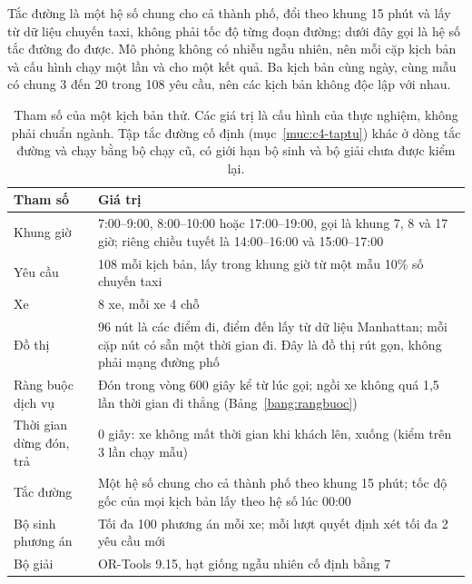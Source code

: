 Tắc đường là một hệ số chung cho cả thành phố, đổi theo khung 15 phút và lấy từ dữ liệu chuyến taxi, không phải tốc độ
từng đoạn đường; dưới đây gọi là hệ số tắc đường đo được. Mô phỏng không có nhiễu ngẫu nhiên, nên mỗi cặp
kịch bản và cấu hình chạy một lần và cho một kết quả. Ba kịch bản cùng ngày, cùng mẫu có chung 3 đến 20 trong 108 yêu
cầu, nên các kịch bản không độc lập với nhau.

\begin{table}[htbp]
\centering
\caption{Tham số của một kịch bản thử. Các giá trị là cấu hình của thực nghiệm, không phải chuẩn ngành. Tập tắc
đường cố định (mục~\ref{muc:c4-taptu}) khác ở dòng tắc đường và chạy bằng bộ chạy cũ, có giới hạn bộ sinh và bộ
giải chưa được kiểm lại.}
\label{bang:c4-thamso}
\small
\begin{tabular}{@{}p{4.0cm}p{11.0cm}@{}}
\toprule
\textbf{Tham số} & \textbf{Giá trị}\\
\midrule
Khung giờ & 7:00--9:00, 8:00--10:00 hoặc 17:00--19:00, gọi là khung 7, 8 và 17 giờ; riêng chiều tuyết
là 14:00--16:00 và 15:00--17:00\\
Yêu cầu & 108 mỗi kịch bản, lấy trong khung giờ từ một mẫu 10\% số chuyến taxi\\
Xe & 8 xe, mỗi xe 4 chỗ\\
Đồ thị & 96 nút là các điểm đi, điểm đến lấy từ dữ liệu Manhattan; mỗi cặp nút có sẵn một thời gian đi. Đây là
đồ thị rút gọn, không phải mạng đường phố\\
Ràng buộc dịch vụ & Đón trong vòng 600 giây kể từ lúc gọi; ngồi xe không quá 1,5 lần thời gian đi
thẳng (Bảng~\ref{bang:rangbuoc})\\
Thời gian dừng đón, trả & 0 giây: xe không mất thời gian khi khách lên, xuống (kiểm trên 3 lần chạy mẫu)\\
Tắc đường & Một hệ số chung cho cả thành phố theo khung 15 phút; tốc độ gốc của mọi kịch bản lấy theo hệ số lúc
00:00\\
Bộ sinh phương án & Tối đa 100 phương án mỗi xe; mỗi lượt quyết định xét tối đa 2 yêu cầu mới\\
Bộ giải & OR-Tools 9.15, hạt giống ngẫu nhiên cố định bằng 7\\
\bottomrule
\end{tabular}
\end{table}

